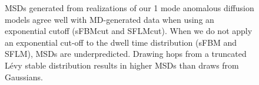 \documentclass{article}
\begin{document}
\begin{figure}
  \caption{MSDs generated from realizations of our 1 mode anomalous diffusion models
  agree well with MD-generated data
  when using an exponential cutoff (sFBMcut and SFLMcut).
  When we do not apply an exponential cut-off to the
  dwell time distribution (sFBM and SFLM), MSDs are underpredicted. 
  Drawing hops from
  a truncated L\'evy stable distribution results in higher MSDs than draws from Gaussians.}\label{fig:anomalous_msds_1mode}
  \end{figure}
  
\end{document}
